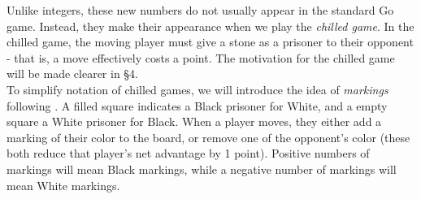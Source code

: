 \documentclass[../math194_paper.tex]{subfiles}
\begin{document}
Unlike integers, these new numbers do not usually appear in the standard Go game. Instead, they 
make their appearance when we play the \textit{chilled game}. In the chilled game, the moving 
player must give a stone as a prisoner to their opponent - that is, a move effectively costs a 
point. The motivation for the chilled game will be made clearer in \S 4.\\

To simplify notation of chilled games, we will introduce the idea of \textit{markings} following 
\cite[\S 4.1]{berlekamp1994mathematical}. A filled square indicates a Black prisoner for White, and 
a empty square a White prisoner for Black. When a player moves, they either add a marking of
their color to the board, or remove one of the opponent's color (these both reduce that player's
net advantage by 1 point). Positive numbers of markings will mean Black markings, while a negative
number of markings will mean White markings.\\
\end{document}
